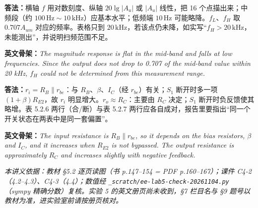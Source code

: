 \documentclass[11pt]{ctexart}
\let\origsubhdr\subhdr
\renewcommand{\subhdr}[1]{\needspace{3\baselineskip}\origsubhdr{#1}}
\begin{document}


\textbf{答法：}横轴 $f$ 用对数刻度、纵轴 $20\lg|A_u|$ 或 $|A_u|$ 线性，把 16 个点描出来；中频段（约 $100\,\mathrm{Hz}\sim10\,\mathrm{kHz}$）应基本水平；低频端 $10\,\mathrm{Hz}$ 可能略降。$f_L$、$f_H$ 取 $0.707A_{um}$ 对应的频率。表格只到 $20\,\mathrm{kHz}$，若该点仍未降，如实写“$f_H>20\,\mathrm{kHz}$，未能测出”，并说明扫频范围不足。

\textbf{英文骨架：}\textit{The magnitude response is flat in the mid-band and falls at low frequencies. Since the output does not drop to 0.707 of the mid-band value within 20 kHz, $f_H$ could not be determined from this measurement range.}



\textbf{答法：}$r_i=R_B\parallel r_{be}$：与 $R_B$、$\beta$、$I_C$（经 $r_{be}$）有关；$S_1$ 断开时多一项 $(1+\beta)R_{E2}$，故 $r_i$ 明显增大。$r_o\approx R_C$：主要由 $R_C$ 决定；$S_1$ 断开时负反馈使其略增。表 5.2.6 两行（合/断）与表 5.2.7 两行应各自成对，报告里要指出“同一个开关状态在两表中是同一套偏置”。

\textbf{英文骨架：}\textit{The input resistance is $R_B\parallel r_{be}$, so it depends on the bias resistors, $\beta$ and $I_C$, and it increases when $R_{E2}$ is not bypassed. The output resistance is approximately $R_C$ and increases slightly with negative feedback.}

\flowerrule

\noindent\textit{本讲义依据：教材 §5.2 逐页读图（书 p.147--154 = PDF p.160--167）；课件 C4-2（4.2--4.3）、C4-3（4.4）；数值经 \texttt{\_scratch/ee-lab5-check-20261104.py}（sympy 精确分数）复核。实验 5 的英文册页尚未收到，§7 栏目名与 §9 题号以教材为准，进实验室前请按册页核对。}
\end{document}
